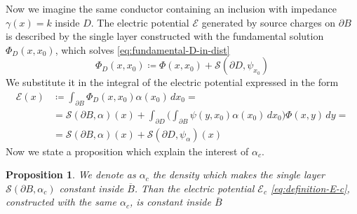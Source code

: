\documentclass[10pt, a4paper, twoside, openright]{book}
\theoremstyle{definition}
\theoremstyle{plain}
\theoremstyle{plain}
\theoremstyle{plain}
\newtheorem{proposition}[subsection]{Proposition}
\theoremstyle{plain}
\theoremstyle{plain}
\theoremstyle{plain}
\theoremstyle{plain}
\theoremstyle{plain}
\begin{document}
\par
Now we imagine the same conductor containing an inclusion with impedance $\gamma(x)=k$ inside $D$. The electric potential $\mathcal{E}$ generated by source charges on $\partial B$ is described by the single layer constructed with the fundamental solution $\Phi_D(x,x_0)$, which solves \ref{eq:fundamental-D-in-dist}
\begin{equation}
 \Phi_D(x,x_0)\coloneqq\Phi(x,x_0)+\mathcal{S}(\partial D,\psi_{x_0})\label{eq:decomposition-Phi-D}
\end{equation}
We substitute it in the integral of the electric potential expressed in the form
\begin{align}
 \mathcal{E}(x)&\coloneqq\int_{\partial B}\Phi_D(x,x_0)\alpha(x_0)\,dx_0= \label{eq:definition-E-c}\\
  &=\mathcal{S}(\partial B, \alpha)(x) + \int_{\partial D} \Big(\int_{\partial B}\psi(y,x_0)\alpha(x_0)\,dx_0\Big)\Phi(x,y)\,dy = \\
  &=\mathcal{S}(\partial B, \alpha)(x) + \mathcal{S}(\partial D, \psi_{\alpha})(x)\label{eq:decomposition-E-c}
\end{align}
Now we state a proposition which explain the interest of $\alpha_{c}$.
\begin{proposition}
 We denote as $\alpha_{c}$ the density which makes the single layer $\mathcal{S}(\partial B, \alpha_{c})$ constant inside $\overline{B}$.
 Than the electric potential $\mathcal{E}_{c}$ \ref{eq:definition-E-c}, constructed with the same $\alpha_{c}$, is constant inside $\overline{B}$
\end{proposition}
\end{document}
